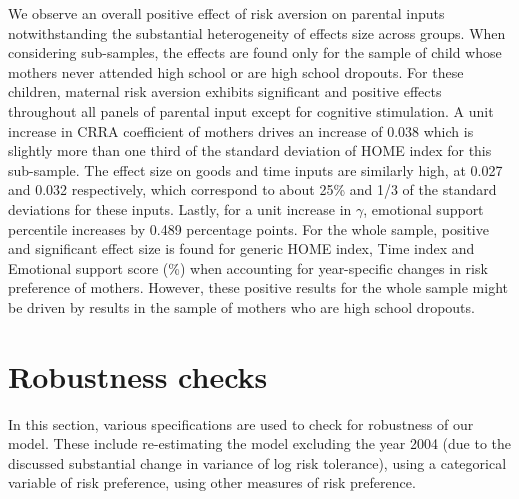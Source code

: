 \documentclass[]{article}
\begin{document}
We observe an overall positive effect of risk aversion on parental inputs notwithstanding the substantial heterogeneity of effects size across groups. When considering sub-samples, the effects are found only for the sample of child whose mothers never attended high school or are high school dropouts. For these children, maternal risk aversion exhibits significant and positive effects throughout all panels of parental input except for cognitive stimulation. A unit increase in CRRA coefficient of mothers drives an increase of 0.038 which is slightly more than one third of the standard deviation of HOME index for this sub-sample. The effect size on goods and time inputs are similarly high, at 0.027 and 0.032 respectively, which correspond to about 25\% and 1/3 of the standard deviations for these inputs. Lastly, for a unit increase in $\gamma$, emotional support percentile increases by 0.489 percentage points. For the whole sample, positive and significant effect size is found for generic HOME index, Time index and Emotional support score (\%) when accounting for year-specific changes in risk preference of mothers. However, these positive results for the whole sample might be driven by results in the sample of mothers who are high school dropouts. 








\section{Robustness checks}
In this section, various specifications are used to check for robustness of our model. These include re-estimating the model excluding the year 2004 (due to the discussed substantial change in variance of log risk tolerance), using a categorical variable of risk preference, using other measures of risk preference.
\end{document}
